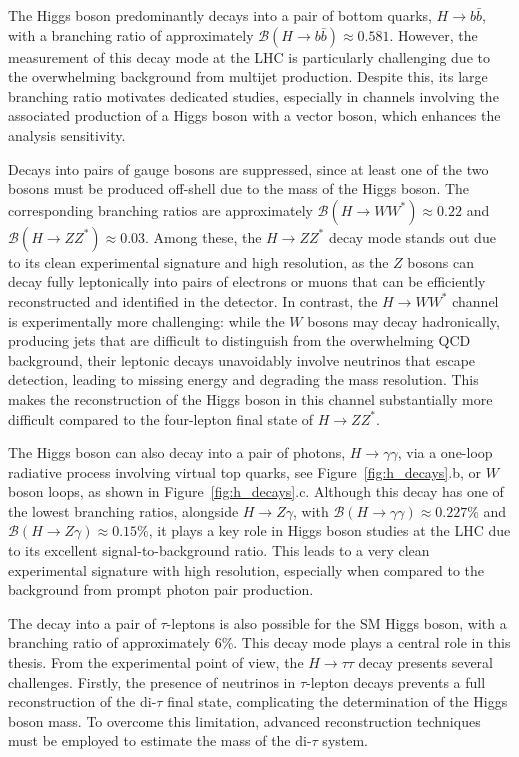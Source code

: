 

The Higgs boson predominantly decays into a pair of bottom quarks, \( H \rightarrow b\bar{b} \), with a branching ratio of approximately \( \mathcal{B}(H \rightarrow b\bar{b}) \approx 0.581 \). However, the measurement of this decay mode at the LHC is particularly challenging due to the overwhelming background from multijet production. Despite this, its large branching ratio motivates dedicated studies, especially in channels involving the associated production of a Higgs boson with a vector boson, which enhances the analysis sensitivity.

Decays into pairs of gauge bosons are suppressed, since at least one of the two bosons must be produced off-shell due to the mass of the Higgs boson. The corresponding branching ratios are approximately \( \mathcal{B}(H \rightarrow WW^*) \approx 0.22 \) and \( \mathcal{B}(H \rightarrow ZZ^*) \approx 0.03 \). Among these, the \( H \rightarrow ZZ^* \) decay mode stands out due to its clean experimental signature and high resolution, as the $Z$ bosons can decay fully leptonically into pairs of electrons or muons that can be efficiently reconstructed and identified in the detector. 
In contrast, the \( H \rightarrow WW^* \) channel is experimentally more challenging: while the $W$ bosons may decay hadronically, producing jets that are difficult to distinguish from the overwhelming QCD background, their leptonic decays unavoidably involve neutrinos that escape detection, leading to missing energy and degrading the mass resolution. This makes the reconstruction of the Higgs boson in this channel substantially more difficult compared to the four-lepton final state of \( H \rightarrow ZZ^* \).

The Higgs boson can also decay into a pair of photons, \( H \rightarrow \gamma\gamma \), via a one-loop radiative process involving virtual top quarks, see Figure~\ref{fig:h_decays}.b, or $W$ boson loops, as shown in Figure~\ref{fig:h_decays}.c. Although this decay has one of the lowest branching ratios, alongside \( H \rightarrow Z\gamma \), with \( \mathcal{B}(H \rightarrow \gamma\gamma) \approx 0.227\% \) and \( \mathcal{B}(H \rightarrow Z\gamma) \approx 0.15\% \), it plays a key role in Higgs boson studies at the LHC due to its excellent signal-to-background ratio. This leads to a very clean experimental signature with high resolution, especially when compared to the background from prompt photon pair production.

The decay into a pair of $\tau$-leptons is also possible for the SM Higgs boson, with a branching ratio of approximately 6\%. This decay mode plays a central role in this thesis. From the experimental point of view, the $H \rightarrow \tau\tau$ decay presents several challenges. Firstly, the presence of neutrinos in $\tau$-lepton decays prevents a full reconstruction of the di-$\tau$ final state, complicating the determination of the Higgs boson mass. To overcome this limitation, advanced reconstruction techniques must be employed to estimate the mass of the di-$\tau$ system.

